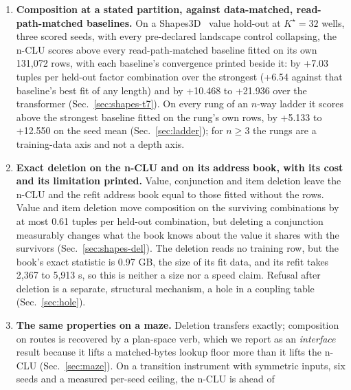 \documentclass{article} %
\newcommand{\Kstar}{\ensuremath{K^{\star}}}
\begin{document}
\begin{enumerate}[leftmargin=*,itemsep=2pt]
\item \textbf{Composition at a stated partition, against data-matched, read-path-matched baselines.} On a
  Shapes3D~\citep{burgess2018shapes,kim2018disentangling} value hold-out at $\Kstar=32$ wells, three scored seeds, with every %
  pre-declared landscape control collapsing, the n-CLU scores above every read-path-matched baseline
  fitted on its own 131,072 rows, with each baseline's convergence printed beside it: by +7.03 tuples %
  per held-out factor combination over the strongest (+6.54 against that baseline's best fit of any length) and by +10.468 %
  to +21.936 over the transformer (Sec.~\ref{sec:shapes-t7}). On every rung of an $n$-way ladder it %
  scores above the strongest baseline fitted on the rung's own rows, by +5.133 to +12.550 on the seed %
  mean (Sec.~\ref{sec:ladder}); for $n\ge3$ the rungs are a training-data axis and not a depth axis.
\item \textbf{Exact deletion on the n-CLU and on its address book, with its cost and its limitation
  printed.} Value, conjunction and item deletion leave the n-CLU and the refit address book equal to
  those fitted without the rows. Value and item deletion move composition on the surviving combinations by
  at most 0.61 tuples per held-out combination, but deleting a conjunction measurably changes what the book knows %
  about the value it shares with the survivors (Sec.~\ref{sec:shapes-del}). The deletion reads no
  training row, but the book's exact statistic is 0.97 GB, the size of its fit data, and its refit %
  takes 2,367 to 5,913 s, so this is neither a size nor a speed claim. Refusal after deletion is a %
  separate, structural mechanism, a hole in a coupling table (Sec.~\ref{sec:hole}).
\item \textbf{The same properties on a maze.} Deletion transfers exactly; composition on routes is
  recovered by a plan-space verb, which we report as an \emph{interface} result because it lifts a
  matched-bytes lookup floor more than it lifts the n-CLU (Sec.~\ref{sec:maze}). On a transition
  instrument with symmetric inputs, six seeds and a measured per-seed ceiling, the n-CLU is ahead of

\end{enumerate}
\end{document}
